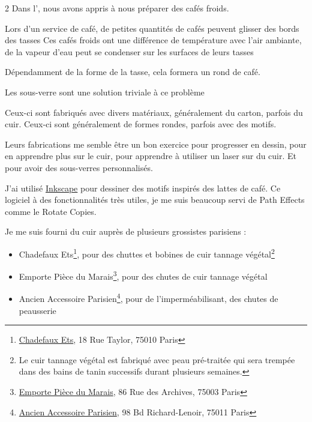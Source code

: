 \documentclass[a4paper,11pt]{article}
\title{\mousevox{
  \blogtitle{Des Sous-Verres façon Furry au laser}
} {
  \blogtitle{Des Sous-Verres en Cuir au laser}
}}
\author{}
\date{}
\begin{document}

\maketitle

\thispagestyle{first}
\begin{blogmain}
\begin{multicols}{2}
  Dans l', nous avons appris à nous préparer des cafés froids.
  
  Lors d’un service de café, de petites quantités de cafés peuvent glisser des bords des tasses
  Ces cafés froids ont une différence de température avec l'air ambiante, de la vapeur d'eau peut se condenser sur les surfaces de leurs tasses
  
  Dépendamment de la forme de la tasse, cela formera un rond de café.
  
  Les sous-verre sont une solution triviale à ce problème
  
  Ceux-ci sont fabriqués avec divers matériaux, généralement du carton, parfois du cuir.
  Ceux-ci sont généralement de formes rondes, parfois avec des motifs.
  
  Leurs fabrications me semble être un bon exercice pour progresser en dessin, pour en apprendre plus sur le cuir, pour apprendre à utiliser un laser sur du cuir. Et pour avoir des sous-verres personnalisés.
  
  J'ai utilisé \href{https://inkscape.org}{Inkscape} pour dessiner des motifs inspirés des lattes de café. Ce logiciel à des fonctionnalités très utiles, je me suis beaucoup servi de Path Effects comme le Rotate Copies.


  
  
  Je me suis fourni du cuir auprès de plusieurs grossistes parisiens :
  \begin{itemize}
    \item Chadefaux Ets\footnote{\href{https://cuirschadefaux.com}{Chadefaux Ets}, 18 Rue Taylor, 75010 Paris}, pour des chuttes et bobines de cuir tannage végétal\footnote{Le cuir tannage végétal est fabriqué avec peau pré-traitée qui sera trempée dans des bains de tanin successifs durant plusieurs semaines.}
    \item Emporte Pièce du Marais\footnote{\href{https://cuirsdepaname.fr/collections/cuirs-classiques}{Emporte Pièce du Marais}, 86 Rue des Archives, 75003 Paris}, pour des chutes de cuir tannage végétal
    \item Ancien Accessoire Parisien\footnote{\href{https://accessoire-parisien.com}{Ancien Accessoire Parisien}, 98 Bd Richard-Lenoir, 75011 Paris}, pour de l'imperméabilisant, des chutes de peausserie
  \end{itemize}
  

\end{multicols}
\end{blogmain}
\end{document}

